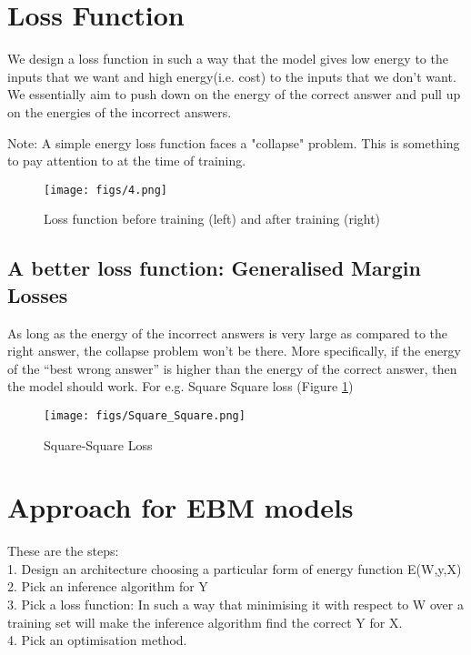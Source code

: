 \section{Loss Function}

We design a loss function in such a way that the model gives low energy to the inputs that we want and high energy(i.e. cost) to the inputs that we don’t want. We essentially aim to push down on the energy of the correct answer and pull up on the energies of the incorrect answers.

Note: A simple energy loss function faces a "collapse" problem. This is something to pay attention to at the time of training.

\begin{figure}[t]
\centering
\texttt{[image: figs/4.png]}
\caption{Loss function before training (left) and after training (right)}
\end{figure}

\subsection{A better loss function: Generalised Margin Losses}
As long as the energy of the incorrect answers is very large as compared to the right answer, the collapse problem won't be there. More specifically, if the energy of the “best wrong answer” is higher than the energy of the correct answer, then the model should work. For e.g. Square Square loss (Figure \ref{fig:sqloss})
\begin{figure}[ht]
\centering
\texttt{[image: figs/Square\_Square.png]}
\caption{Square-Square Loss}
\label{fig:sqloss}
\end{figure}

\section{Approach for EBM models}
These are the steps: \\
1. Design an architecture choosing a particular form of energy function E(W,y,X) \\
2. Pick an inference algorithm for Y \\
3. Pick a loss function: In such a way that minimising it with respect to W over a training set will make the inference algorithm find the correct Y for X.\\
4. Pick an optimisation method.

